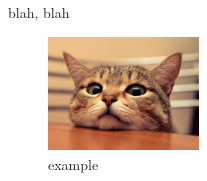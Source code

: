 \documentclass[PICOReport.tex]{subfiles}
\begin{document}
blah, blah

\begin{figure}[!htb]
\centering
\includegraphics[width=4cm]{images/example}
\caption{example}
\label{fig:im_3}
\end{figure}
\end{document}
